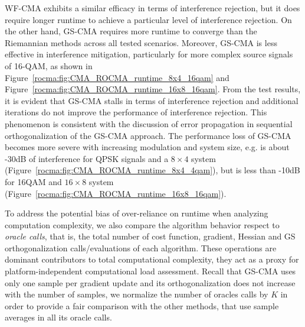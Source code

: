 WF-CMA exhibits a similar efficacy in terms
of interference rejection, but it does
require longer runtime to achieve a particular level of interference rejection.  On the other hand, GS-CMA requires more runtime to
converge than the Riemannian methods across all tested scenarios. Moreover, GS-CMA is less effective in interference mitigation, particularly
for more complex source signals of 16-QAM, as shown in Figure~\ref{rocma:fig:CMA_ROCMA_runtime_8x4_16qam} 
and Figure~\ref{rocma:fig:CMA_ROCMA_runtime_16x8_16qam}.
From the test results, it is evident that
GS-CMA stalls in terms of interference rejection
and additional iterations do not improve 
the performance of 
interference rejection. This phenomenon is
consistent with the discussion of error propagation in sequential orthogonalization of the GS-CMA
approach. The performance loss of GS-CMA
becomes more severe with increasing modulation 
and system size, e.g. is about -30dB of interference for QPSK signals and a $8\times4$ system (Figure~\ref{rocma:fig:CMA_ROCMA_runtime_8x4_4qam}), but is less than -10dB for 16QAM and $16\times8$ system (Figure~\ref{rocma:fig:CMA_ROCMA_runtime_16x8_16qam}). 


To address the potential bias of over-reliance on runtime when analyzing computation complexity, we also compare the algorithm behavior respect to \emph{oracle calls}, that is, the total 
number of cost function, gradient, Hessian and GS orthogonalization calls/evaluations of each algorithm. 
These operations are dominant contributors to total computational complexity, they act as a proxy for platform-independent computational load assessment.
Recall that GS-CMA uses only one sample per gradient update and its orthogonalization does not increase with the number of samples, we normalize the number of oracles calls by $K$ in order to provide a fair comparison with the other methods, that use sample averages in all its oracle calls.

